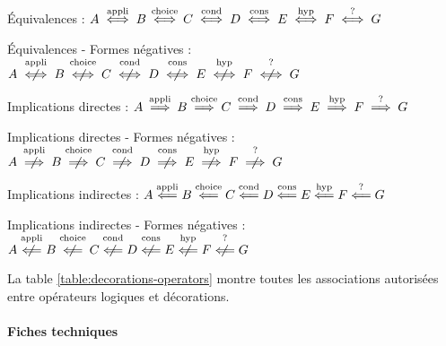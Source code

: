 \documentclass[12pt,a4paper]{article}
\begin{document}
\begin{tcblisting}{}
Équivalences :
$A \iffappli B \iffchoice C \iffcond D \iffcons E \iffhyp F \ifftest G$

Équivalences - Formes négatives :
$A \notiffappli B \notiffchoice C \notiffcond D
   \notiffcons E \notiffhyp F \notifftest G$

Implications directes :
$A \impliesappli B \implieschoice C \impliescond D
   \impliescons E \implieshyp F \impliestest G$

Implications directes - Formes négatives :
$A \notimpliesappli B \notimplieschoice C \notimpliescond D
   \notimpliescons E \notimplieshyp F \notimpliestest G$

Implications indirectes :
$A \liesimpappli B \liesimpchoice C \liesimpcond D
   \liesimpcons E \liesimphyp F \liesimptest G$

Implications indirectes - Formes négatives :
$A \notliesimpappli B \notliesimpchoice C \notliesimpcond D
   \notliesimpcons E \notliesimphyp F \notliesimptest G$
\end{tcblisting}



\begin{remark}
	La table \ref{table:decorations-operators}  montre toutes les associations autorisées entre opérateurs logiques et décorations.
\end{remark}


\paragraph{Fiches techniques}
\end{document}
